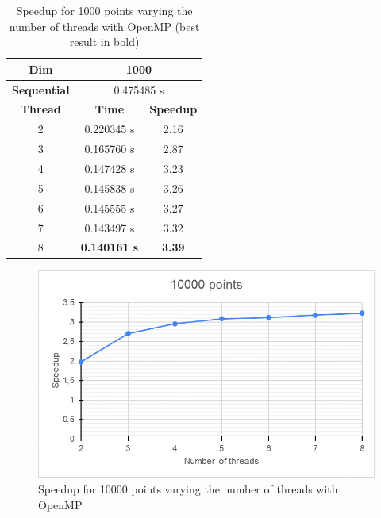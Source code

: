 \documentclass[10pt,twocolumn,letterpaper]{article}
\begin{document}
\begin{table}[]
\centering
\begin{tabular}{|c|c|c|}
\hline
\textbf{Dim} & \multicolumn{2}{c|}{1000} \\ \hline
\textbf{Sequential} & \multicolumn{2}{c|}{0.475485 s} \\ \hline
\textbf{Thread} & \textbf{Time} & \textbf{Speedup} \\ \hline
2 & 0.220345 s & 2.16 \\ \hline
3 & 0.165760 s & 2.87 \\ \hline
4 & 0.147428 s & 3.23 \\ \hline
5 & 0.145838 s & 3.26 \\ \hline
6 & 0.145555 s & 3.27 \\ \hline
7 & 0.143497 s & 3.32 \\ \hline
8 & \textbf{0.140161 s} & \textbf{3.39} \\ \hline
\end{tabular}
\caption{Speedup for 1000 points varying the number of threads with OpenMP (best result in bold)}
\label{tab:table1000points}
\end{table}

\begin{figure}
\includegraphics[width=0.99\linewidth]{img/chart_10000_points}
\caption{Speedup for 10000 points varying the number of threads with OpenMP}
\label{fig:chart10000points}
\end{figure}
\end{document}
